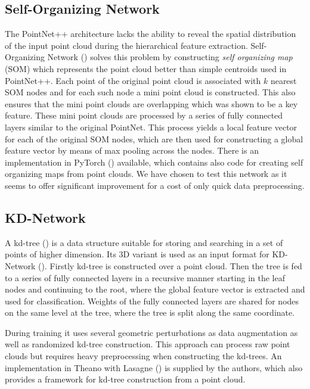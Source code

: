 \subsection{Self-Organizing Network}
The PointNet++ architecture lacks the ability to reveal the spatial distribution of the input point cloud during the hierarchical feature extraction. Self-Organizing Network (\cite{li_so-net:_2018}) solves this problem by constructing \textit{self organizing map} (SOM) which represents the point cloud better than simple centroids used in PointNet++. Each point of the original point cloud is associated with $k$ nearest SOM nodes and for each such node a mini point cloud is constructed. This also ensures that the mini point clouds are overlapping which was shown to be a key feature. These mini point clouds are processed by a series of fully connected layers similar to the original PointNet. This process yields a local feature vector for each of the original SOM nodes, which are then used for constructing a global feature vector by means of max pooling across the nodes. There is an implementation in PyTorch (\cite{li_sonet_2018}) available, which contains also code for creating self organizing maps from point clouds. We have chosen to test this network as it seems to offer significant improvement for a cost of only quick data preprocessing.

\subsection{KD-Network}
A kd-tree (\cite{bentley_multidimensional_1975}) is a data structure suitable for storing and searching in a set of points of higher dimension. Its 3D variant is used as an input format for KD-Network (\cite{klokov_escape_2017}). Firstly kd-tree is constructed over a point cloud. Then the tree is fed to a series of fully connected layers in a recursive manner starting in the leaf nodes and continuing to the root, where the global feature vector is extracted and used for classification. Weights of the fully connected layers are shared for nodes on the same level at the tree, where the tree is split along the same coordinate. \par
During training it uses several geometric perturbations as data augmentation as well as randomized kd-tree construction. This approach can process raw point clouds but requires heavy preprocessing when constructing the kd-trees.
An implementation in Theano with Lasagne (\cite{klokov_kd-net_2017}) is supplied by the authors, which also provides a framework for kd-tree construction from a point cloud.

